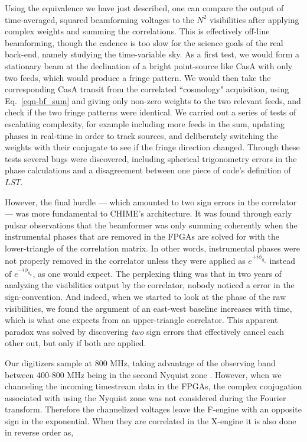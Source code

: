 Using the equivalence we have just described, one can compare the 
output of time-averaged, squared beamforming voltages to 
the $N^2$ visibilities after applying complex 
weights and summing the correlations. This is effectively 
off-line beamforming, though the cadence is too slow for 
the science goals of the real back-end, namely studying the time-variable sky. 
As a first test, 
we would form a stationary beam at the declination of a 
bright point-source like CasA with only two feeds, 
which would produce a fringe pattern. We would then take 
the corresponding CasA transit from the correlated ``cosmology" 
acquisition, using Eq.~\ref{eqn-bf_sum} and giving only non-zero 
weights to the two relevant feeds, and check if the two
fringe patterns were identical. We carried out a series 
of tests of escalating complexity, for example including more feeds in the sum, updating 
phases in real-time in order to track sources, and deliberately 
switching the weights with their conjugate to see if the fringe 
direction changed. Through these tests several bugs were discovered, 
including spherical trigonometry errors in the phase 
calculations and a disagreement between one piece of code's 
definition of $LST$. 

However, the final hurdle
--- which amounted to two sign errors in the correlator --- 
was more fundamental to CHIME's architecture. It was found through 
early pulsar observations that the beamformer was only summing
coherently when the instrumental phases that are removed in 
the FPGAs are solved for with the lower-triangle of the correlation 
matrix. In other words, instrumental phases were not properly 
removed in the correlator unless they were applied as 
$e^{+i\phi_{g_n}}$ instead of $e^{-i\phi_{g_n}}$, as one would expect.
The perplexing thing was that in two years of analyzing 
the visibilities output by the correlator, nobody noticed a 
error in the sign-convention. And indeed, when we started to look
at the phase of the raw visibilities, we found the argument 
of an east-west baseline increases with time, which is 
what one expects from an upper-triangle correlator. This 
apparent paradox was solved by discovering \textit{two} sign errors that
effectively cancel each other out, but only if both are applied. 

Our digitizers sample at 800 MHz, taking advantage of the observing 
band between 400-800 MHz being in the second Nyquist zone \cite{}. 
However, when we channeling 
the incoming timestream data in the FPGAs, the complex conjugation 
associated with using the Nyquist zone was not considered during the 
Fourier transform. Therefore the channelized voltages leave the F-engine 
with an opposite sign in the exponential. When they are correlated
in the X-engine it is also done in reverse order as, 

